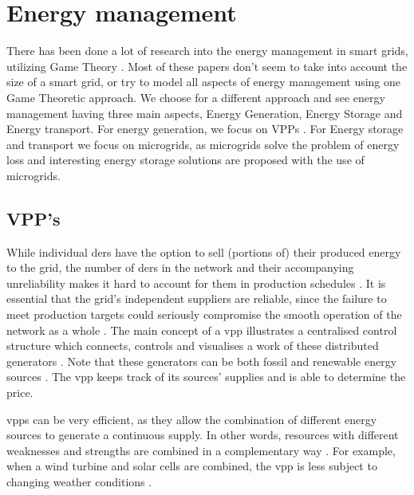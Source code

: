 \section{Energy management}\label{Energy-Management}
There has been done a lot of research into the energy management in smart grids, utilizing Game Theory\cite{WangOuyangKrishnanEtAl2015, TusharZhangSmithEtAl2013} . Most of these papers don't seem to take into account the size of a smart grid, or try to model all aspects of energy management using one Game Theoretic approach. We choose for a different approach and see energy management having three main aspects, Energy Generation, Energy Storage and Energy transport. For energy generation, we focus on \ac{VPP}s . For Energy storage and transport we focus on microgrids, as microgrids solve the problem of energy loss and interesting energy storage solutions are proposed with the use of microgrids.

\subsection{VPP's}
While individual \acp{der} have the option to sell (portions of) their produced energy to the grid, the number of \acp{der} in the network and their accompanying unreliability makes it hard to account for them in production schedules \cite{RobuKotaChalkiadakisEtAl2012}. It is essential that the grid's independent suppliers are reliable, since the failure to meet production targets could seriously compromise the smooth operation of the network as a whole \cite{ChalkiadakisRobuKotaEtAl2011}. The main concept of a \ac{vpp} illustrates a centralised control structure which connects, controls and visualises a work of these distributed generators \cite{NikonowiczMilewski2012}. Note that these generators can be both fossil and renewable energy sources \cite{LombardiPowalkoRudion2009}. The \ac{vpp} keeps track of its sources' supplies and is able to determine the price. 

\acp{vpp} can be very efficient, as they allow the combination of different energy sources to generate a continuous supply. In other words, resources with different weaknesses and strengths are combined in a complementary way \cite{Koeppel2003}. For example, when a wind turbine and solar cells are combined, the \ac{vpp} is less subject to changing weather conditions \cite{Tromly2001, Kumagai2012, MashhourMoghaddas-Tafreshi2011, NikonowiczMilewski2012}. 


